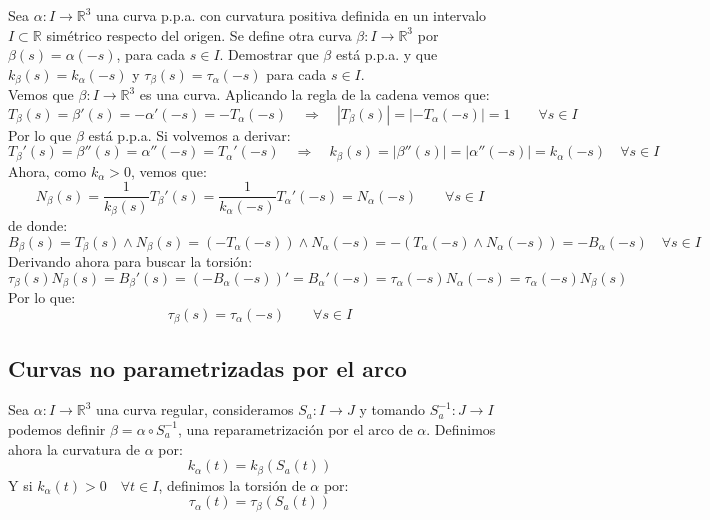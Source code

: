 \begin{ejercicio}
    Sea $\alpha:I\to\mathbb{R}^3$ una curva p.p.a. con curvatura positiva definida en un intervalo $I\subset \mathbb{R}$ simétrico respecto del origen. Se define otra curva $\beta:I\to\mathbb{R}^3$ por $\beta(s) = \alpha(-s)$, para cada $s\in I$. Demostrar que $\beta$ está p.p.a. y que $k_\beta(s) = k_\alpha(-s)$ y $\tau_\beta(s) = \tau_\alpha(-s)$ para cada $s\in I$.\\

    \noindent
    Vemos que $\beta:I\to\mathbb{R}^3$ es una curva. Aplicando la regla de la cadena vemos que:
    \begin{equation*}
        T_\beta(s) = \beta'(s) = -\alpha'(-s) = -T_\alpha(-s) \quad\Longrightarrow\quad |T_\beta(s)| = |-T_\alpha(-s)| = 1 \qquad \forall s\in I
    \end{equation*}
    Por lo que $\beta$ está p.p.a. Si volvemos a derivar:
    \begin{equation*}
        T_\beta'(s) = \beta''(s) = \alpha''(-s) = T_\alpha'(-s) \quad\Longrightarrow\quad k_\beta(s) = |\beta''(s)| = |\alpha''(-s)| = k_\alpha(-s) \quad \forall s\in I
    \end{equation*}
    Ahora, como $k_\alpha>0$, vemos que:
    \begin{equation*}
        N_\beta(s) = \frac{1}{k_\beta(s)}T_\beta'(s) = \frac{1}{k_\alpha(-s)}T_\alpha'(-s) = N_\alpha(-s) \qquad \forall s\in I
    \end{equation*}
    de donde:
    \begin{equation*}
        B_\beta(s) = T_\beta(s)\land N_\beta(s) = (-T_\alpha(-s)) \land N_\alpha(-s) = -(T_\alpha(-s)\land N_\alpha(-s)) = -B_\alpha(-s) \quad \forall s\in I
    \end{equation*}
    Derivando ahora para buscar la torsión:
    \begin{equation*}
        \tau_\beta(s)N_\beta(s) = B_\beta'(s) = (-B_\alpha(-s))' = B_\alpha'(-s) = \tau_\alpha(-s)N_\alpha(-s) = \tau_\alpha(-s)N_\beta(s)
    \end{equation*}
    Por lo que:
    \begin{equation*}
        \tau_\beta(s) = \tau_\alpha(-s) \qquad \forall s\in I
    \end{equation*}
\end{ejercicio}

\subsection{Curvas no parametrizadas por el arco}
\noindent
Sea $\alpha:I\to \mathbb{R}^3$ una curva regular, consideramos $S_a:I\to J$ y tomando $S_a^{-1}:J\to I$ podemos definir $\beta = \alpha\circ S_a^{-1}$, una reparametrización por el arco de $\alpha$. Definimos ahora la curvatura de $\alpha$ por:
\begin{equation*}
    k_\alpha(t) = k_\beta(S_a(t))
\end{equation*}
Y si $k_\alpha(t) > 0 \quad \forall t\in I$, definimos la torsión de $\alpha$ por:
\begin{equation*}
    \tau_\alpha(t) = \tau_\beta(S_a(t))
\end{equation*}

